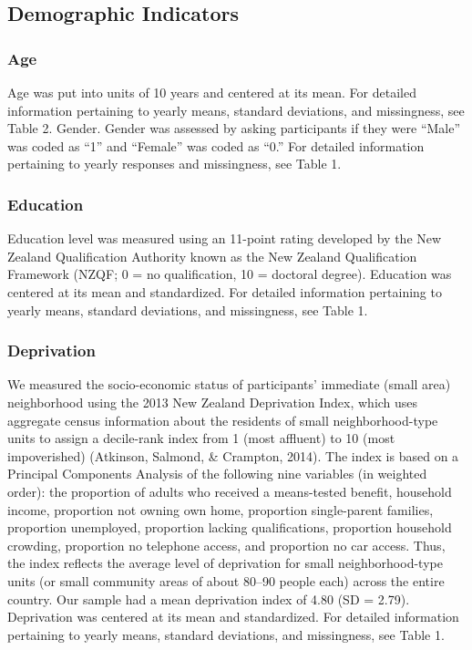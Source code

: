 \documentclass[
  english,
  man]{apa6}
\begin{document}
\hypertarget{demographic-indicators}{%
\subsection{Demographic Indicators}\label{demographic-indicators}}

\hypertarget{age}{%
\subsubsection{Age}\label{age}}

Age was put into units of 10 years and centered at its mean. For detailed information pertaining to yearly means, standard deviations, and missingness, see Table 2.
Gender. Gender was assessed by asking participants if they were \enquote{Male} was coded as \enquote{1} and \enquote{Female} was coded as \enquote{0.} For detailed information pertaining to yearly responses and missingness, see Table 1.

\hypertarget{education}{%
\subsubsection{Education}\label{education}}

Education level was measured using an 11-point rating developed by the New Zealand Qualification Authority known as the New Zealand Qualification Framework (NZQF; 0 = no qualification, 10 = doctoral degree). Education was centered at its mean and standardized. For detailed information pertaining to yearly means, standard deviations, and missingness, see Table 1.

\hypertarget{deprivation}{%
\subsubsection{Deprivation}\label{deprivation}}

We measured the socio-economic status of participants' immediate (small area) neighborhood using the 2013 New Zealand Deprivation Index, which uses aggregate census information about the residents of small neighborhood-type units to assign a decile-rank index from 1 (most affluent) to 10 (most impoverished) (Atkinson, Salmond, \& Crampton, 2014). The index is based on a Principal Components Analysis of the following nine variables (in weighted order): the proportion of adults who received a means-tested benefit, household income, proportion not owning own home, proportion single-parent families, proportion unemployed, proportion lacking qualifications, proportion household crowding, proportion no telephone access, and proportion no car access. Thus, the index reflects the average level of deprivation for small neighborhood-type units (or small community areas of about 80--90 people each) across the entire country. Our sample had a mean deprivation index of 4.80 (SD = 2.79). Deprivation was centered at its mean and standardized. For detailed information pertaining to yearly means, standard deviations, and missingness, see Table 1.
\end{document}

